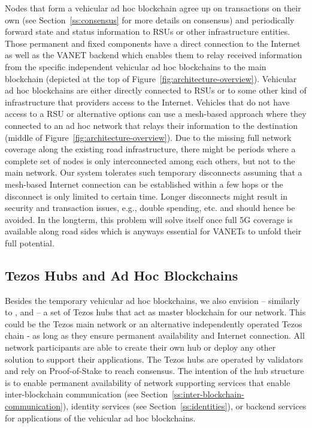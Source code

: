 \documentclass{llncs}
\begin{document}
{			Nodes that form a vehicular ad hoc blockchain agree up on transactions on their own (see Section~\ref{ss:consensus} for more details on consensus) and periodically forward state and status information to RSUs or other infrastructure entities. Those permanent and fixed components have a direct connection to the Internet as well as the VANET backend which enables them to relay received information from the specific independent vehicular ad hoc blockchains to the main blockchain (depicted at the top of Figure~\ref{fig:architecture-overview}). Vehicular ad hoc blockchains are either directly connected to RSUs or to some other kind of infrastructure that providers access to the Internet. Vehicles that do not have access to a RSU or alternative options can use a mesh-based approach where they connected to an ad hoc network that relays their information to the destination (middle of Figure~\ref{fig:architecture-overview}). Due to the missing full network coverage along the existing road infrastructure, there might be periods where a complete set of nodes is only interconnected among each others, but not to the main network. Our system tolerates such temporary disconnects assuming that a mesh-based Internet connection can be established within a few hops or the disconnect is only limited to certain time. Longer disconnects might result in security and transaction issues, e.g., double spending, etc. and should hence be avoided. In the longterm, this problem will solve itself once full 5G coverage is available along road sides which is anyways essential for VANETs to unfold their full potential.
			

		
		\subsection{Tezos Hubs and Ad Hoc Blockchains}
			\label{ss:blockchain-hubs}
			
			Besides the temporary vehicular ad hoc blockchains, we also envision -- similarly to  \cite{monetWhitepaper}, \cite{cosmosWhitepaper} and \cite{chorus2018MCIS} -- a set of Tezos hubs that act as master blockchain for our network. This could be the Tezos main network or an alternative independently operated Tezos chain - as long as they ensure permanent availability and Internet connection. All network participants are able to create their own hub or deploy any other solution to support their applications. The Tezos hubs are operated by validators and rely on Proof-of-Stake to reach consensus. The intention of the hub structure is to enable permanent availability of network supporting services that enable inter-blockchain communication (see Section~\ref{ss:inter-blockchain-communication}), identity services (see Section~\ref{ss:identities}), or backend services for applications of the vehicular ad hoc blockchains.
			
}
\end{document}
